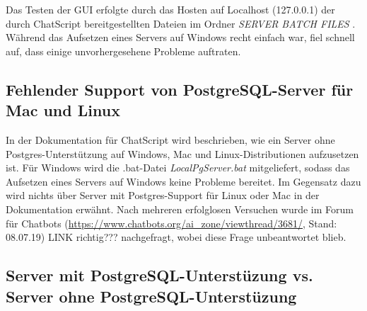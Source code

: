 Das Testen der GUI erfolgte durch das Hosten auf Localhost (127.0.0.1) der durch ChatScript bereitgestellten Dateien im Ordner \textit{SERVER BATCH FILES} \citep{chatscript2019}. Während das Aufsetzen eines Servers auf Windows recht einfach war, fiel schnell auf, dass einige unvorhergesehene Probleme auftraten. 

\subsection{Fehlender Support von PostgreSQL-Server für Mac und Linux}
\label{sec:Fehlender Support von PostgreSQL-Server für Mac und Linux}

In der Dokumentation für ChatScript wird beschrieben, wie ein Server ohne Postgres-Unterstützung auf Windows, Mac und Linux-Distributionen aufzusetzen ist. Für Windows wird die .bat-Datei \textit{LocalPgServer.bat} mitgeliefert, sodass das Aufsetzen eines Servers auf Windows keine Probleme bereitet. Im Gegensatz dazu wird nichts über Server mit Postgres-Support für Linux oder Mac in der Dokumentation erwähnt. Nach mehreren erfolglosen Versuchen wurde im Forum für Chatbots (\url{https://www.chatbots.org/ai_zone/viewthread/3681/}, Stand: 08.07.19) \textcolor[rgb]{1,0.68,0.36}{LINK richtig???} nachgefragt, wobei diese Frage unbeantwortet blieb. 

\subsection{Server mit PostgreSQL-Unterstüzung vs. Server ohne PostgreSQL-Unterstüzung}
\label{sec: Server mit PostgreSQL-Unterstüzung vs. Server ohne PostgreSQL-Unterstüzung}

